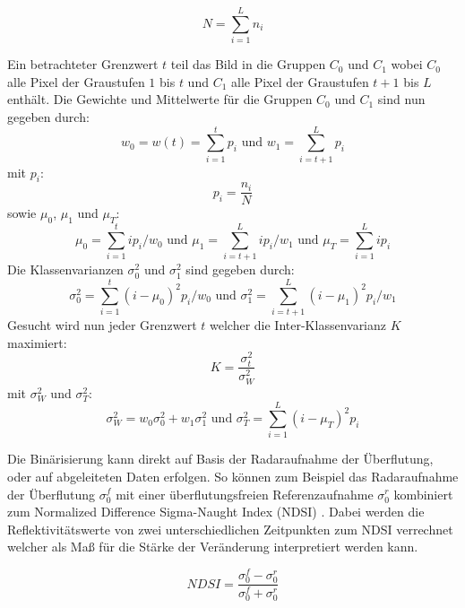 \begin{equation}
    N = \sum_{i=1}^{L} n_i
\end{equation}

Ein betrachteter Grenzwert $t$ teil das Bild in die Gruppen $C_0$ und $C_1$ wobei $C_0$ alle Pixel der Graustufen $1$ bis $t$ und 
$C_1$ alle Pixel der Graustufen $t+1$ bis $L$ enthält. Die Gewichte und Mittelwerte für die Gruppen $C_0$ und $C_1$ sind nun gegeben durch:
\begin{equation}
    w_0 = w(t) = \sum_{i=1}^{t} p_i
    \text{   und   }
    w_1 = \sum_{i=t+1}^{L} p_i
\end{equation}
mit $p_i$: 
\begin{equation}
    p_i = \frac{n_i}{N}
\end{equation}
sowie $\mu_0$, $\mu_1$ und $\mu_T$:
\begin{equation}
    \mu_0 = \sum_{i=1}^{t} ip_i/w_0
    \text{   und   }
    \mu_1 = \sum_{i=t+1}^{L} ip_i/w_1
    \text{   und   }
    \mu_T = \sum_{i=1}^{L} ip_i
\end{equation}
Die Klassenvarianzen $\sigma_0^2$ und $\sigma_1^2$ sind gegeben durch:
\begin{equation}
    \sigma_0^2 =  \sum_{i=1}^{t} (i-\mu_0)^2p_i/w_0
    \text{   und   }
    \sigma_1^2 = \sum_{i=t+1}^{L} (i-\mu_1)^2p_i/w_1
\end{equation}
Gesucht wird nun jeder Grenzwert $t$ welcher die Inter-Klassenvarianz $K$ maximiert:
\begin{equation}
    K = \frac{\sigma_t^2}{\sigma_W^2}
\end{equation}
mit $\sigma_W^2$ und $\sigma_T^2$:
\begin{equation}
    \sigma_W^2 = w_0\sigma_0^2 + w_1\sigma_1^2
    \text{   und   }
    \sigma_T^2 = \sum_{i=1}^{L} (i-\mu_T)^2p_i
\end{equation}

Die Binärisierung kann direkt auf Basis der Radaraufnahme der Überflutung, oder auf abgeleiteten Daten erfolgen. So können zum Beispiel das Radaraufnahme der Überflutung
$\sigma_0^f$ mit einer überflutungsfreien Referenzaufnahme $\sigma_0^r$ kombiniert zum Normalized Difference Sigma-Naught Index (NDSI) \cite{flood_proxy_mapping_ndsi}.
Dabei werden die Reflektivitätswerte von zwei unterschiedlichen Zeitpunkten zum NDSI verrechnet welcher als Maß für die Stärke der Veränderung interpretiert werden kann. 

\begin{equation}
    NDSI = \frac{\sigma_0^f-\sigma_0^r}{\sigma_0^f+\sigma_0^r}
\end{equation} 

